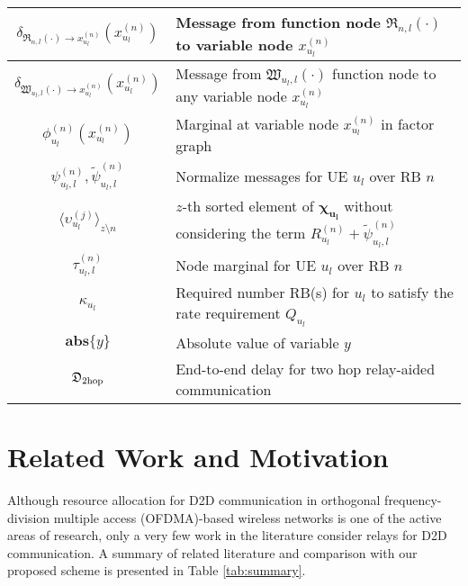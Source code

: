 \documentclass[twocolumn,10pt]{IEEEtran}
\begin{document}
\begin{table}[!t]
\begin{tabular}{c|p{5.2cm}}
\hline $\delta_{\mathfrak{R}_{n,l}(\cdot) \rightarrow x_{u_l}^{(n)}} \left( x_{u_l}^{(n)} \right)$ & Message from function node $\mathfrak{R}_{n,l}(\cdot)$ to variable node $x_{u_l}^{(n)}$ \\
\hline $\delta_{\mathfrak{W}_{u_l, l}(\cdot)  \rightarrow x_{u_l}^{(n)}} \left( x_{u_l}^{(n)} \right)$ & Message from $\mathfrak{W}_{u_l, l}(\cdot)$ function node to any variable node $x_{u_l}^{(n)}$  \\
\hline $\phi_{u_l}^{(n)}\left( x_{u_l}^{(n)} \right)$ & Marginal at variable node $x_{u_l}^{(n)}$ in factor graph \\
\hline $\psi_{u_l, l}^{(n)}, \tilde{\psi}_{u_l, l}^{(n)}$  & Normalize messages for UE $u_l$ over RB $n$ \\
\hline $\langle \upsilon_{u_l}^{(j)}\rangle_{z \setminus n}$ & $z$-th sorted element of $\boldsymbol {\chi_{u_l}}$ without considering the term $R_{u_l}^{(n)} + \tilde{\psi}_{u_l, l}^{(n)}$ \\
\hline $\tau_{u_l, l}^{(n)} $ & Node marginal for UE $u_l$ over RB $n$ \\
\hline $\kappa_{u_l}$ & Required number RB(s) for $u_l$ to satisfy the rate requirement $Q_{u_l}$\\
\hline $\mathbf{abs}\lbrace y \rbrace$ & Absolute value of variable $y$ \\
\hline $\mathfrak{D}_{\rm 2 hop}$ & End-to-end delay for two hop relay-aided communication \\
\hline 
\end{tabular}
\end{table}

\section{Related Work and Motivation} \label{sec:related_works}

Although resource allocation for D2D communication in orthogonal frequency-division multiple access (OFDMA)-based wireless networks is one of the active areas of research, only a very few work in the literature consider relays for D2D communication. A summary of related literature and comparison with our proposed scheme is presented in Table \ref{tab:summary}.
\end{document}
